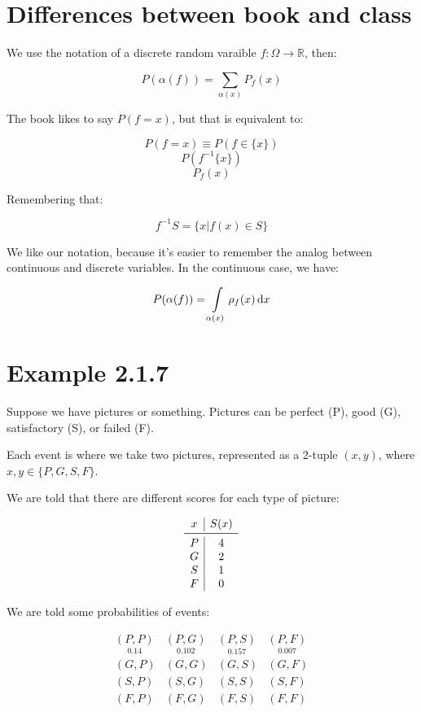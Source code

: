 \documentclass{article}
\newcommand{\inv}[1]{#1^{-1}}
\renewcommand{\d}[1]{\,\textnormal{d}#1}
\begin{document}
\section*{Differences between book and class}

We use the notation of a discrete random varaible
$f:\Omega\rightarrow\mathbb{R}$, then:

\[
P(\alpha(f))=\sum\limits_{\alpha(x)}P_f(x)
\]

The book likes to say $P(f=x)$, but that is equivalent to:

\[
P(f=x)\equiv P(f\in\{x\})
\] \[
P(\inv{f}\{x\})
\] \[
P_f(x)
\]

Remembering that:

\[
\inv{f}S=\{x|f(x)\in S\}
\]

We like our notation, because it's easier to remember the analog
between continuous and discrete variables. In the continuous case, we
have:

\[
P(\alpha(f))=\int\limits_{\alpha(x)}\rho_f(x)\d{x}
\]

\section*{Example 2.1.7}

Suppose we have pictures or something. Pictures can be perfect (P),
good (G), satisfactory (S), or failed (F).

Each event is where we take two pictures, represented as a 2-tuple
$(x,y)$, where $x,y\in\{P,G,S,F\}$.

We are told that there are different scores for each type of picture:

\[
\begin{array}{c|c}
x & S(x) \\
\midrule
P & 4 \\
G & 2 \\
S & 1 \\
F & 0 \\
\end{array}
\]

We are told some probabilities of events:

\[
\begin{array}{cccc}
\underset{0.14}{(P,P)} & \underset{0.102}{(P,G)} & \underset{0.157}{(P,S)} & \underset{0.007}{(P,F)} \\
(G,P) & (G,G) & (G,S) & (G,F) \\
(S,P) & (S,G) & (S,S) & (S,F) \\
(F,P) & (F,G) & (F,S) & (F,F) \\
\end{array}
\]
\end{document}
